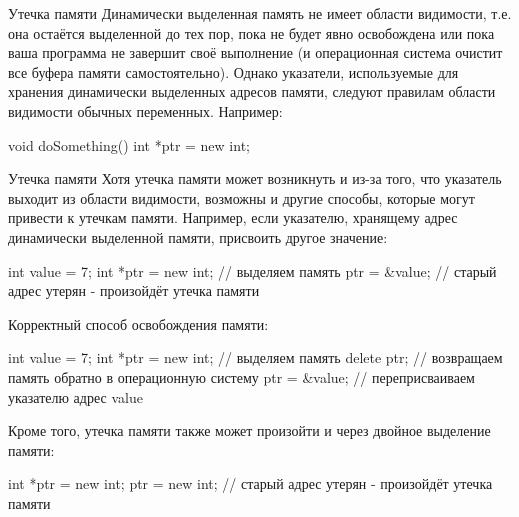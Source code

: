 \documentclass[
    9pt,
    hyperref={pdfencoding=unicode}
    ]{beamer}
\theoremstyle{definition}
\begin{document}
\begin{frame}[fragile]{Утечка памяти}
    Динамически выделенная память не имеет области видимости, т.е. она остаётся выделенной до тех пор, пока не будет явно освобождена или пока ваша программа не завершит своё выполнение (и операционная система очистит все буфера памяти самостоятельно). Однако указатели, используемые для хранения динамически выделенных адресов памяти, следуют правилам области видимости обычных переменных. Например:
    \begin{cppcode}
        void doSomething(){
            int *ptr = new int;
        }
    \end{cppcode}

   
\end{frame}

\begin{frame}[fragile]{Утечка памяти}
    Хотя утечка памяти может возникнуть и из-за того, что указатель выходит из области видимости, возможны и другие способы, которые могут привести к утечкам памяти. Например, если указателю, хранящему адрес динамически выделенной памяти, присвоить другое значение:
    \begin{cppcode}
        int value = 7;
        int *ptr = new int; // выделяем память
        ptr = &value; // старый адрес утерян - произойдёт утечка памяти
    \end{cppcode}
    
    Корректный способ освобождения памяти:
    \begin{cppcode}
        int value = 7;
        int *ptr = new int; // выделяем память
        delete ptr; // возвращаем память обратно в операционную систему
        ptr = &value; // переприсваиваем указателю адрес value
    \end{cppcode}

    Кроме того, утечка памяти также может произойти и через двойное выделение памяти:
    \begin{cppcode}
        int *ptr = new int;
        ptr = new int; // старый адрес утерян - произойдёт утечка памяти
    \end{cppcode}
    
\end{frame}




%    
\end{document}
